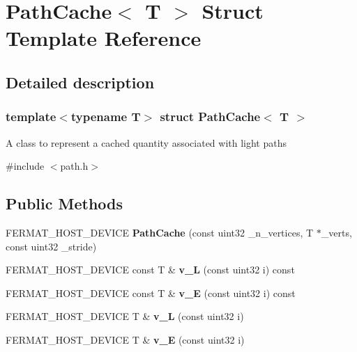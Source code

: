 \hypertarget{struct_path_cache}{}\section{Path\+Cache$<$ T $>$ Struct Template Reference}
\label{struct_path_cache}


\subsection{Detailed description}
\subsubsection*{template$<$typename T$>$\newline
struct Path\+Cache$<$ T $>$}

A class to represent a cached quantity associated with light paths 

{\ttfamily \#include $<$path.\+h$>$}

\subsection*{Public Methods}
\begin{DoxyCompactItemize}
\item 
\mbox{\label{struct_path_cache_a33110c21eba89f9882291b3a5e2218cd}} 
F\+E\+R\+M\+A\+T\+\_\+\+H\+O\+S\+T\+\_\+\+D\+E\+V\+I\+CE {\bfseries Path\+Cache} (const uint32 \+\_\+n\+\_\+vertices, T $\ast$\+\_\+verts, const uint32 \+\_\+stride)
\item 
\mbox{\label{struct_path_cache_af7885c4534245e6818c70342e7cf4bb2}} 
F\+E\+R\+M\+A\+T\+\_\+\+H\+O\+S\+T\+\_\+\+D\+E\+V\+I\+CE const T \& {\bfseries v\+\_\+L} (const uint32 i) const
\item 
\mbox{\label{struct_path_cache_a49222f1790b3b72fa4c9111a1038d97c}} 
F\+E\+R\+M\+A\+T\+\_\+\+H\+O\+S\+T\+\_\+\+D\+E\+V\+I\+CE const T \& {\bfseries v\+\_\+E} (const uint32 i) const
\item 
\mbox{\label{struct_path_cache_a53bdad471a0c0c28aacc8b91f651210a}} 
F\+E\+R\+M\+A\+T\+\_\+\+H\+O\+S\+T\+\_\+\+D\+E\+V\+I\+CE T \& {\bfseries v\+\_\+L} (const uint32 i)
\item 
\mbox{\label{struct_path_cache_a22c0fb695af62b48a66b4768aaeacdf3}} 
F\+E\+R\+M\+A\+T\+\_\+\+H\+O\+S\+T\+\_\+\+D\+E\+V\+I\+CE T \& {\bfseries v\+\_\+E} (const uint32 i)
\end{DoxyCompactItemize}
